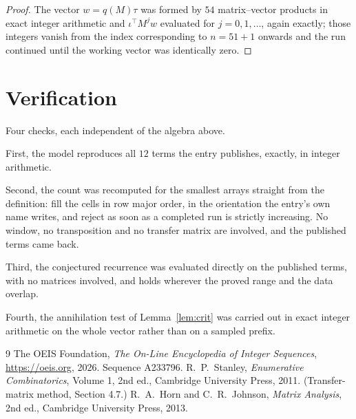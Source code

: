 \documentclass[11pt,a4paper]{article}
\theoremstyle{plain}
\theoremstyle{definition}
\begin{document}
\begin{proof}
The vector $w=q(M)\tau$ was formed by $54$ matrix--vector products in exact integer
arithmetic and $\iota^{\!\top}M^{j}w$ evaluated for $j=0,1,\dots$, again exactly; those
integers vanish from the index corresponding to $n=51+1$ onwards and the run continued
until the working vector was identically zero.
\end{proof}

\section{Verification}

Four checks, each independent of the algebra above.

First, the model reproduces all $12$ terms the entry publishes, exactly, in integer
arithmetic.

Second, the count was recomputed for the smallest arrays straight from the definition: fill the
cells in row major order, in the orientation the entry's own name writes, and reject as soon as
a completed run is strictly increasing. No window, no transposition and no transfer matrix are involved, and
the published terms came back.

Third, the conjectured recurrence was evaluated directly on the published terms, with no
matrices involved, and holds wherever the proved range and the data overlap.

Fourth, the annihilation test of Lemma~\ref{lem:crit} was carried out in exact integer
arithmetic on the whole vector rather than on a sampled prefix.

\begin{thebibliography}{9}
 The OEIS Foundation, \emph{The On-Line Encyclopedia of Integer
Sequences}, \url{https://oeis.org}, 2026. Sequence A233796.
 R.~P.~Stanley, \emph{Enumerative Combinatorics}, Volume 1, 2nd ed.,
Cambridge University Press, 2011. (Transfer-matrix method, Section 4.7.)
 R.~A.~Horn and C.~R.~Johnson, \emph{Matrix Analysis}, 2nd ed., Cambridge
University Press, 2013.
\end{thebibliography}
\end{document}
